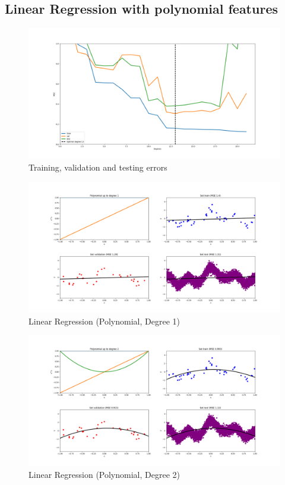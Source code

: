 \documentclass[12pt,halfline,a4paper]{ouparticle}
\begin{document}
\subsection{Linear Regression with polynomial features}
	\begin{figure}[H]
	\centering
	        \includegraphics[width=\textwidth]{figures/linreg_errors.png}
	    \caption{Training, validation and testing errors}
	\end{figure}
	\begin{figure}[H]
	\centering
	        \includegraphics[width=\textwidth]{figures/linreg_degree_1.png}
	    \caption{Linear Regression (Polynomial, Degree 1)}
	\end{figure}
	\begin{figure}[H]
	\centering
	        \includegraphics[width=\textwidth]{figures/linreg_degree_2.png}
	    \caption{Linear Regression (Polynomial, Degree 2)}
	\end{figure}
\end{document}
